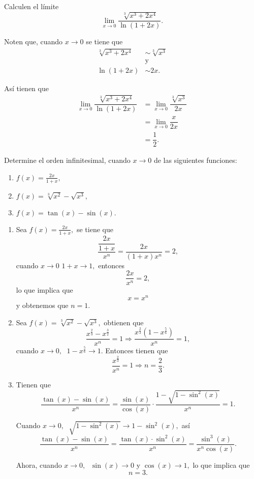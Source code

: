 \begin{example}
	Calculen el l\'imite
	\[
	\lim\limits_{x\to 0}\dfrac{\sqrt[3]{x^3+2x^4}}{\ln(1+2x)}.
	\]
	
	Noten que, cuando \(x\to 0\) se tiene que
	\begin{align*}
	\sqrt[3]{x^3+2x^4}&\sim \sqrt[3]{x^3}\\	&\text{y}\\	\ln(1+2x)&\sim 2x.
	\end{align*}
	
	As\'i tienen que
	\begin{align*}
	\lim\limits_{x\to 0}\dfrac{\sqrt[3]{x^3+2x^4}}{\ln(1+2x)}&=\lim\limits_{x\to 0}\dfrac{\sqrt[3]{x^3}}{2x}\\
	&=\lim\limits_{x\to 0}\dfrac{x}{2x}\\
	&=\dfrac{1}{2}.
	\end{align*}
\end{example}


\begin{exercise}
	Determine el orden  infinitesimal, cuando \(x\to 0\) de las siguientes funciones:
	\begin{enumerate}
		\item \(f(x)=\frac{2x}{1+x},\)
		\item \(f(x)=\sqrt[3]{x^2}-\sqrt{x^3},\)
		\item \(f(x)=\tan (x)-\sin(x).\)
	\end{enumerate}
\end{exercise}

\begin{example}
	\begin{enumerate}
		\item Sea \(f(x)=\frac{2x}{1+x},\) se tiene que
		\[
		\dfrac{\dfrac{2x}{1+x}}{x^n}=\dfrac{2x}{(1+x)x^n}=2,
		\]
		cuando \(x\to 0\) \(1+x\to 1,\) entonces 
		\[
		\dfrac{2x}{x^n}=2,
		\]
		lo que implica que
		\[
		x=x^n
		\]
		y obtenemos que \(n=1.\)
		
		\item Sea \(f(x)=\sqrt[3]{x^2}-\sqrt{x^3},\) obtienen que
		\[
		\dfrac{x^{\frac{2}{3}}-x^{\frac{3}{2}}}{x^n}=1\Rightarrow\dfrac{x^{\frac{2}{3}}\left(1-x^{\frac{5}{6}}\right)}{x^n}=1,
		\]
		cuando \(x\to 0,\) \(\;1-x^{\frac{5}{6}}\to 1.\) Entonces tienen que
		\[
		\dfrac{x^{\frac{2}{3}}}{x^n}=1\Rightarrow n=\dfrac{2}{3}.
		\]
		
		\item Tienen que
		\[
		\dfrac{\tan(x)-\sin(x)}{x^n}=\dfrac{\sin(x)}{\cos(x)}\cdot\dfrac{1-\sqrt{1-\sin^2(x)}}{x^n}=1.
		\]
		
		Cuando \(x\to 0,\) \(\;\sqrt{1-\sin^2(x)}\to 1-\sin^2(x),\) as\'i 
		\[
		\dfrac{\tan(x)-\sin(x)}{x^n}=\dfrac{\tan(x)\cdot\sin^2(x)}{x^n}=\dfrac{\sin^3(x)}{x^n\cos(x)}.
		\]
		
		Ahora, cuando \(x\to 0,\) \(\;\sin(x)\to 0\) y \(\cos(x)\to 1,\) lo que implica que
		\[
		n=3.
		\]
	\end{enumerate}
\end{example}

